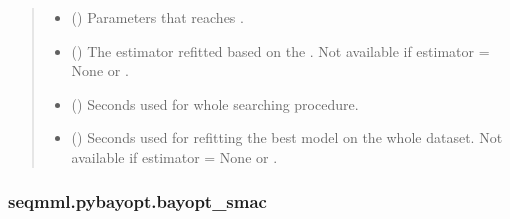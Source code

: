 \documentclass[letterpaper,10pt,english]{sphinxmanual}
\begin{document}
\begin{fulllineitems}
\begin{quote}
\begin{description}
\begin{itemize}
\item {} 
 () \textendash{} Parameters that reaches .

\item {} 
 () \textendash{} The estimator refitted based on the . 
Not available if estimator = None or .

\item {} 
 () \textendash{} Seconds used for whole searching procedure.

\item {} 
 () \textendash{} Seconds used for refitting the best model on the whole dataset.
Not available if estimator = None or .

\end{itemize}

\end{description}\end{quote}

\end{fulllineitems}



\subsubsection{seqmml.pybayopt.bayopt\_smac}
\label{\detokenize{apidoc:module-pybayopt.bayopt_smac}}\label{\detokenize{apidoc:seqmml-pybayopt-bayopt-smac}}
\end{document}
